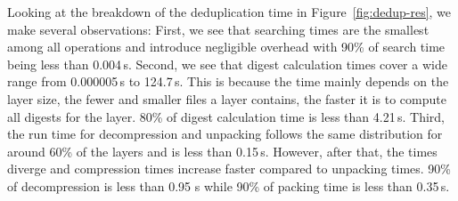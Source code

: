 %
Looking at the breakdown of the deduplication time in Figure~\ref{fig:dedup-res},
we make several observations:
%
First, we see that searching times are the smallest among all operations
and introduce negligible overhead with 90\% of search time being less than
0.004\,s. 
%
%
%
Second, we see that digest calculation times cover a wide range
from 0.000005\,s to 124.7\,s.
%
This is because the time mainly depends on the layer size, \ie the fewer and smaller
files a layer contains, the faster it is to compute all digests for the layer.
%
%
%
80\% of digest calculation time is less than 4.21\,s. 
%
%
%
Third, the run time for decompression and unpacking follows the same distribution
for around 60\% of the layers and is less than 0.15\,s.
%
%
However, after that, the times diverge and compression times increase faster compared
to unpacking times.
%
90\% of decompression is less than 0.95 s while 90\% of packing time is less than 0.35\,s.

